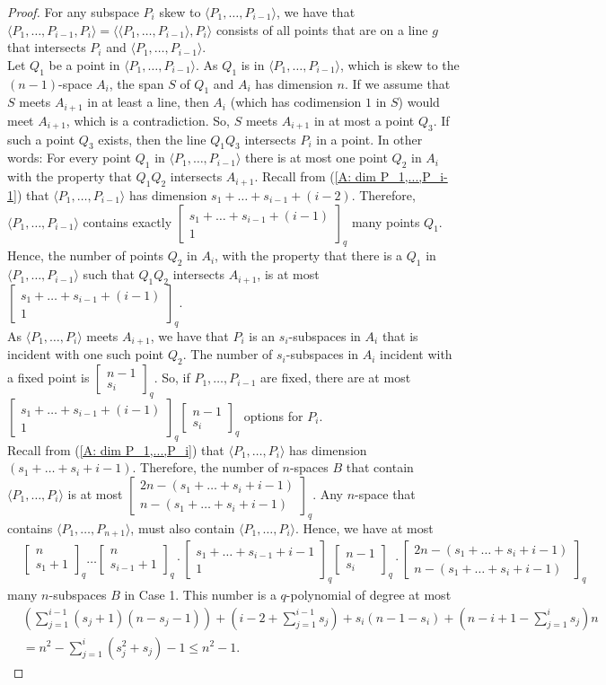 \documentclass[11pt, oneside, a4paper]{article}
\newcommand{\Gauss}[2]{{\begin{bmatrix} #1 \\ #2 \end{bmatrix}_q}}
\begin{document}
\begin{proof}
For any subspace $P_i$ skew to $\langle P_1,\ldots,P_{i-1} \rangle$, we have that $\langle P_1,\ldots,P_{i-1},P_i \rangle=\langle \langle P_1,\ldots,P_{i-1} \rangle,P_i \rangle$ consists of all points that are on a line $g$ that intersects $P_i$ and $\langle P_1,\ldots,P_{i-1} \rangle$.\\
 Let $Q_1$ be a point in  $\langle P_1,\ldots,P_{i-1} \rangle$. As $Q_1$ is in  $\langle P_1,\ldots,P_{i-1} \rangle$, which is skew to the $(n-1)$-space $A_i$, the span $S$ of $Q_1$ and $A_i$ has dimension $n$. If we assume that $S$ meets $A_{i+1}$ in at least a line, then $A_i$ (which has codimension $1$ in $S$) would meet $A_{i+1}$, which is a contradiction. 
 So, $S$ meets $A_{i+1}$ in at most a point $Q_3$. If such a point $Q_3$ exists, then the line $Q_1Q_3$ intersects $P_i$ in a point.
In other words: For every point $Q_1$ in $\langle P_1,\ldots,P_{i-1} \rangle$ there is at most one point $Q_2$ in $A_i$ with the property that $Q_1Q_2$ intersects $A_{i+1}$.
 Recall from (\ref{A: dim P_1,...,P_i-1}) that $\langle P_1,\ldots,P_{i-1}\rangle$ has dimension $s_1+\ldots+s_{i-1}+(i-2)$.
 Therefore, $\langle P_1,\ldots,P_{i-1}\rangle$ contains exactly $\Gauss{s_1+\ldots+s_{i-1}+ (i-1)}{1}$ many points $Q_1$.
Hence, the number of points $Q_2$ in $A_i$, with the property that there is a $Q_1$ in $\langle P_1,\ldots,P_{i-1}\rangle$ such that $Q_1Q_2$ intersects $A_{i+1}$, is at most  $\Gauss{s_1+\ldots+s_{i-1}+ (i-1)}{1}$. \\
As $\langle P_1,\ldots,P_{i} \rangle$ meets $A_{i+1}$, we have that $P_i$ is an $s_i$-subspaces in $A_i$ that is incident with one such point $Q_2$. The number of $s_i$-subspaces in $A_i$ incident with a fixed point is $\Gauss{n-1}{s_i}$.
 So, if $P_1,\ldots,P_{i-1}$ are fixed, there are at most $\Gauss{s_1+\ldots+s_{i-1}+ (i-1)}{1}\Gauss{n-1}{s_i}$ options for $P_i$. \\ 
Recall from (\ref{A: dim P_1,...,P_i}) that $\langle P_1,\ldots,P_{i} \rangle$ has dimension $(s_1+\ldots+s_i+i-1)$.
Therefore, the number of $n$-spaces $B$ that contain  $\langle P_1,\ldots,P_{i} \rangle$ is at most
 $\Gauss{2n-(s_1+\ldots+s_i+i-1)}{n-(s_1+\ldots+s_i+i-1)}$.  
Any $n$-space that contains $\langle P_1,\ldots,P_{n+1} \rangle$, must also contain $\langle P_1,\ldots,P_{i} \rangle$. Hence, we have at most
    \begin{align*}
        &\Gauss{n}{s_1+1} \ldots   \Gauss{n}{s_{i-1}+1}  \cdot \Gauss{s_1+\ldots+s_{i-1}+i-1}{1}\Gauss{n-1}{s_i}   \cdot\Gauss{2n-(s_1+\ldots+s_i+i-1)}{n-(s_1+\ldots+s_i+i-1)}
    \end{align*}
   many $n$-subspaces $B$ in Case 1. This number is a $q$-polynomial of degree at most
\begin{align*}
    &\left( \sum\limits_{j=1}^{i-1}(s_j+1)(n-s_j-1) \right)
    +(i-2+\sum\limits_{j=1}^{i-1}s_j)+s_i(n-1-s_i)+(n-i+1-\sum\limits_{j=1}^{i}s_j)n\\
    &=n^2 -\sum\limits_{j=1}^{i}(s_j^2+s_j) - 1\leq n^2-1.
\end{align*}


\end{proof}
\end{document}
